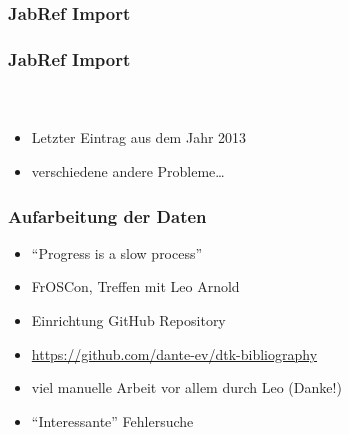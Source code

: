 \documentclass[ngerman]{beamer}
\begin{document}
\begin{frame}
\frametitle{JabRef Import}

\begin{center}
\end{center}
\end{frame}


\begin{frame}
\frametitle{JabRef Import}
\framesubtitle{~}

\begin{itemize}
	\item Letzter Eintrag aus dem Jahr 2013
	\item verschiedene andere Probleme\ldots
\end{itemize}

\begin{center}
\end{center}

\end{frame}

\begin{frame}
\frametitle{Aufarbeitung der Daten}

\begin{itemize}
\item \enquote{Progress is a slow process}
\item FrOSCon, Treffen mit Leo Arnold
\item Einrichtung GitHub Repository
\item \url{https://github.com/dante-ev/dtk-bibliography}
\item viel manuelle Arbeit vor allem durch Leo (Danke!)
\item \enquote{Interessante} Fehlersuche
\end{itemize}
\end{frame}
\end{document}

